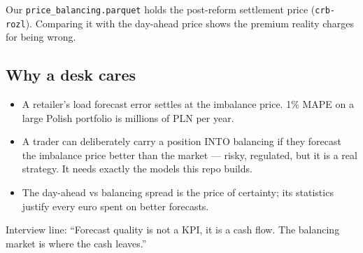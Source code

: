Our \texttt{price\_balancing.parquet} holds the post-reform settlement
price (\texttt{crb-rozl}). Comparing it with the day-ahead price shows
the premium reality charges for being wrong.

\subsection{Why a desk cares}

\begin{itemize}
  \item A retailer's load forecast error settles at the imbalance price.
        1\% MAPE on a large Polish portfolio is millions of PLN per year.
  \item A trader can deliberately carry a position INTO balancing if
        they forecast the imbalance price better than the market --- risky,
        regulated, but it is a real strategy. It needs exactly the models
        this repo builds.
  \item The day-ahead vs balancing spread is the price of certainty; its
        statistics justify every euro spent on better forecasts.
\end{itemize}

Interview line: ``Forecast quality is not a KPI, it is a cash flow. The
balancing market is where the cash leaves.''
